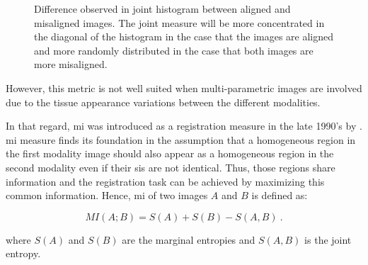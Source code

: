 \begin{figure}
\centering
	\hspace*{\fill}
	 \hfill
	\hspace*{\fill}
	\caption{Difference observed in joint histogram between aligned and misaligned images. The joint measure will be more concentrated in the diagonal of the histogram in the case that the images are aligned and more randomly distributed in the case that both images are more misaligned.}
	\label{fig:jointhisto}
\end{figure}

However, this metric is not well suited when multi-parametric images are involved due to the tissue appearance variations between the different modalities.

In that regard, \ac{mi} was introduced as a registration measure in the late 1990's by \cite{Pluim2003}. \Ac{mi} measure finds its foundation in the assumption that a homogeneous region in the first modality image should also appear as a homogeneous region in the second modality even if their \acp{si} are not identical. Thus, those regions share information and the registration task can be achieved by maximizing this common information. Hence, \Ac{mi} of two images $A$ and $B$ is defined as:

\begin{equation}
	MI(A;B) = S(A) + S(B) - S(A,B) \ .
	\label{eq:midef}
\end{equation}

\noindent where $S(A)$ and $S(B)$ are the marginal entropies and $S(A,B)$ is the joint entropy.

